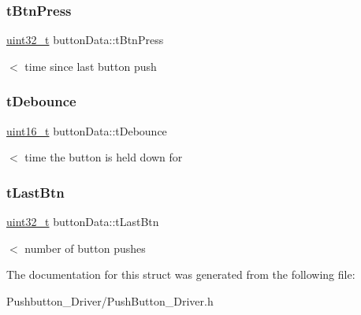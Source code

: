 \subsubsection{\texorpdfstring{t\+Btn\+Press}{tBtnPress}}
{\footnotesize\ttfamily \hyperlink{vl53l0x__types_8h_a435d1572bf3f880d55459d9805097f62}{uint32\+\_\+t} button\+Data\+::t\+Btn\+Press}

$<$ time since last button push \mbox{\label{structbuttonData_a172467069638e0427e606e58408f25b3}} 
\subsubsection{\texorpdfstring{t\+Debounce}{tDebounce}}
{\footnotesize\ttfamily \hyperlink{vl53l0x__types_8h_a273cf69d639a59973b6019625df33e30}{uint16\+\_\+t} button\+Data\+::t\+Debounce}

$<$ time the button is held down for \mbox{\label{structbuttonData_ad8db5fdf61df4a87f43d487cc35d65bf}} 
\subsubsection{\texorpdfstring{t\+Last\+Btn}{tLastBtn}}
{\footnotesize\ttfamily \hyperlink{vl53l0x__types_8h_a435d1572bf3f880d55459d9805097f62}{uint32\+\_\+t} button\+Data\+::t\+Last\+Btn}

$<$ number of button pushes 

The documentation for this struct was generated from the following file\+:\begin{DoxyCompactItemize}
\item 
Pushbutton\+\_\+\+Driver/Push\+Button\+\_\+\+Driver.\+h\end{DoxyCompactItemize}
